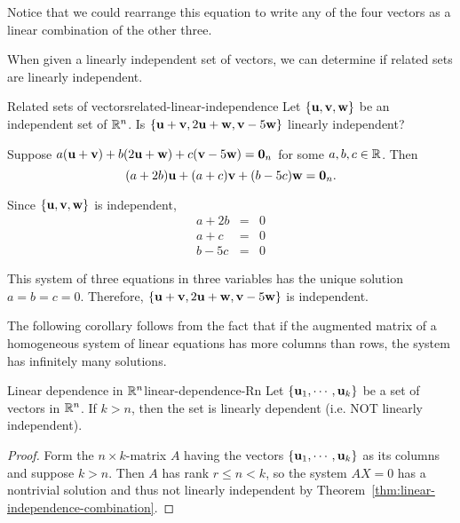 \begin{solution}
Notice that we could rearrange this equation to write any of the four vectors as a linear combination of the other three. 
\end{solution}

When given a linearly independent set of vectors, we can determine if related sets are linearly independent. 

\begin{example}{Related sets of vectors}{related-linear-independence}
Let $\left\{\mbox{\bf u},\mbox{\bf v},\mbox{\bf w}\right\}$ be an independent set of $\mathbb{R}^n$.
Is $\left\{\mbox{\bf u}+\mbox{\bf v}, 2\mbox{\bf u}+\mbox{\bf w}, \mbox{\bf v}-5\mbox{\bf w}\right\}$ linearly
independent?
\end{example}

\begin{solution}
Suppose $a(\mbox{\bf u}+\mbox{\bf v}) + b(2\mbox{\bf u}+\mbox{\bf w}) + c(\mbox{\bf v}-5\mbox{\bf w})=\mbox{\bf 0}_n$
for some $a,b,c\in\mathbb{R}$.
Then 
\[ (a+2b)\mbox{\bf u} + (a+c)\mbox{\bf v} + (b-5c)\mbox{\bf w}=\mbox{\bf 0}_n.\]

Since $\left\{\mbox{\bf u},\mbox{\bf v},\mbox{\bf w}\right\}$ is independent, 
\begin{eqnarray*}
a + 2b & = & 0 \\
a + c & = & 0 \\
b - 5c & = & 0 
\end{eqnarray*}

This system of three equations in three variables has 
the unique solution $a=b=c=0$.
Therefore, $\left\{\mbox{\bf u}+\mbox{\bf v}, 2\mbox{\bf u}+\mbox{\bf w}, \mbox{\bf v}-5\mbox{\bf w}\right\}$ is independent.
\end{solution}

The following corollary follows from the fact that if the augmented matrix of a homogeneous
system of linear equations has more columns than rows, the system has infinitely many
solutions.

\begin{corollary}{Linear dependence in $\mathbb{R}^{n}$}{linear-dependence-Rn}
Let $\left\{\mbox{\bf u}_{1},\cdots ,\mbox{\bf u}_{k}\right\} $
be a set of vectors in $\mathbb{R}^{n}$. 
If $k>n$, then the set is linearly dependent (i.e. NOT linearly independent).
\end{corollary}

\begin{proof}
Form the $n \times k$-matrix $A$ having the vectors $\left\{
\mbox{\bf u}_{1},\cdots ,\mbox{\bf u}_{k}\right\} $ as its columns and suppose $k > n$. Then $A$ has rank $r \leq n <k$, so 
the system $AX=0$ has a nontrivial solution %
 and thus not linearly independent by Theorem~\ref{thm:linear-independence-combination}.
\end{proof}

